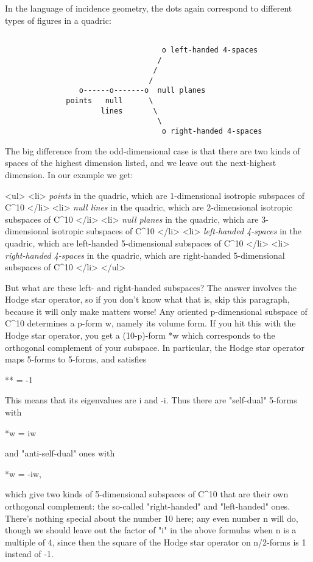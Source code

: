 In the language of incidence geometry, the dots again 
correspond to different types of figures in a quadric:



\begin{verbatim}

                                    o left-handed 4-spaces
                                   /
                                  /
                                 /
                 o------o-------o  null planes
              points   null      \
                      lines       \
                                   \
                                    o right-handed 4-spaces 
\end{verbatim}
    
The big difference from the odd-dimensional case is that there are two
kinds of spaces of the highest dimension listed, and we leave out the
next-highest dimension.  In our example we get:

<ul>
<li>
\emph{points} in the quadric, which are 
1-dimensional isotropic subspaces of C^{10}
</li>
<li>
\emph{null lines} in the quadric, which are 
2-dimensional isotropic subspaces of C^{10}
</li>
<li>
\emph{null planes} in the quadric, which are 
3-dimensional isotropic subspaces of C^{10}
</li>
<li>
\emph{left-handed 4-spaces} in the quadric, which are 
left-handed 5-dimensional subspaces of C^{10}
</li>
<li>
\emph{right-handed 4-spaces} in the quadric, which are 
right-handed 5-dimensional subspaces of C^{10}
</li>
</ul>

But what are these left- and right-handed subspaces?  The answer involves
the Hodge star operator, so if you don't know what that is, skip this
paragraph, because it will only make matters worse!  Any oriented
p-dimensional subspace of C^{10} determines a p-form w, namely its
volume form.  If you hit this with the Hodge star operator, you get a
(10-p)-form *w which corresponds to the orthogonal complement of your
subspace.  In particular, the Hodge star operator maps 5-forms to
5-forms, and satisfies

** = -1

This means that its eigenvalues are i and -i.   Thus there are
"self-dual" 5-forms with 

*w = iw 

and "anti-self-dual" ones with 

*w = -iw,

which give two kinds of 5-dimensional subspaces of C^{10}
that are their
own orthogonal complement: the so-called "right-handed" 
and "left-handed" 
ones.  There's nothing special about the number 10 here; any even number 
n will do, though we should leave out the factor of "i" in the above 
formulas when n is a multiple of 4, since then the square of the Hodge 
star operator on n/2-forms is 1 instead of -1.

